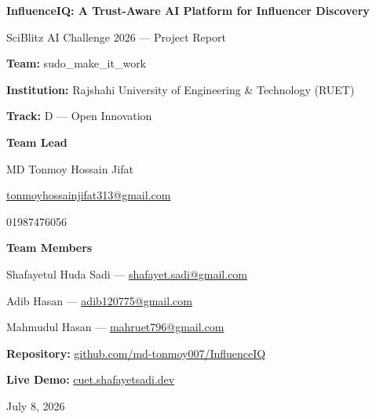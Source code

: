 \documentclass[11pt,a4paper]{article}
\begin{document}
\begin{titlepage}
\thispagestyle{empty}
\begin{center}
\vspace*{0.12\textheight}
{\fontsize{24}{30}\selectfont \textbf{InfluenceIQ: A Trust-Aware AI Platform for Influencer Discovery}\par}
\vspace{0.9cm}
{\Large SciBlitz AI Challenge 2026 --- Project Report\par}
\vspace{1.5cm}

{\large
\textbf{Team:} sudo\_make\_it\_work\par
\vspace{0.22cm}
\textbf{Institution:} Rajshahi University of Engineering \& Technology (RUET)\par
\vspace{0.22cm}
\textbf{Track:} D --- Open Innovation\par
}

\vspace{1.0cm}

{\large
\textbf{Team Lead}\par
MD Tonmoy Hossain Jifat\par
\href{mailto:tonmoyhossainjifat313@gmail.com}{tonmoyhossainjifat313@gmail.com}\par
01987476056\par
}

\vspace{0.9cm}

{\large
\textbf{Team Members}\par
\vspace{0.18cm}
Shafayetul Huda Sadi --- \href{mailto:shafayet.sadi@gmail.com}{shafayet.sadi@gmail.com}\par
\vspace{0.08cm}
Adib Hasan --- \href{mailto:adib120775@gmail.com}{adib120775@gmail.com}\par
\vspace{0.08cm}
Mahmudul Hasan --- \href{mailto:mahruet796@gmail.com}{mahruet796@gmail.com}\par
}

\vfill

{\large
\textbf{Repository:} \href{https://github.com/md-tonmoy007/InfluenceIQ}{github.com/md-tonmoy007/InfluenceIQ}\par
\vspace{0.18cm}
\textbf{Live Demo:} \href{https://cuet.shafayetsadi.dev/}{cuet.shafayetsadi.dev}\par
\vspace{0.45cm}
July 8, 2026\par
}
\end{center}
\end{titlepage}
\end{document}
